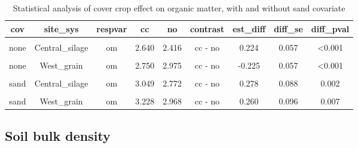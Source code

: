\documentclass[
]{article}
\begin{document}
\begin{table}[H]

\caption{\label{tab:omstats}Statistical analysis of cover crop effect on organic matter, with and without sand covariate}
\centering
\begin{tabular}[t]{ccccccccc}
\toprule
cov & site\_sys & respvar & cc & no & contrast & est\_diff & diff\_se & diff\_pval\\
\midrule
\cellcolor{gray!6}{none} & \cellcolor{gray!6}{Central\_grain} & \cellcolor{gray!6}{om} & \cellcolor{gray!6}{2.360} & \cellcolor{gray!6}{2.480} & \cellcolor{gray!6}{cc - no} & \cellcolor{gray!6}{-0.120} & \cellcolor{gray!6}{0.051} & \cellcolor{gray!6}{0.02}\\
\cmidrule{1-9}
none & Central\_silage & om & 2.640 & 2.416 & cc - no & 0.224 & 0.057 & <0.001\\
\cmidrule{1-9}
\cellcolor{gray!6}{none} & \cellcolor{gray!6}{East\_grain} & \cellcolor{gray!6}{om} & \cellcolor{gray!6}{3.575} & \cellcolor{gray!6}{3.675} & \cellcolor{gray!6}{cc - no} & \cellcolor{gray!6}{-0.100} & \cellcolor{gray!6}{0.057} & \cellcolor{gray!6}{0.082}\\
\cmidrule{1-9}
none & West\_grain & om & 2.750 & 2.975 & cc - no & -0.225 & 0.057 & <0.001\\
\cmidrule{1-9}
\cellcolor{gray!6}{sand} & \cellcolor{gray!6}{Central\_grain} & \cellcolor{gray!6}{om} & \cellcolor{gray!6}{3.034} & \cellcolor{gray!6}{3.066} & \cellcolor{gray!6}{cc - no} & \cellcolor{gray!6}{-0.032} & \cellcolor{gray!6}{0.082} & \cellcolor{gray!6}{0.696}\\
\cmidrule{1-9}
sand & Central\_silage & om & 3.049 & 2.772 & cc - no & 0.278 & 0.088 & 0.002\\
\cmidrule{1-9}
\cellcolor{gray!6}{sand} & \cellcolor{gray!6}{East\_grain} & \cellcolor{gray!6}{om} & \cellcolor{gray!6}{2.290} & \cellcolor{gray!6}{2.105} & \cellcolor{gray!6}{cc - no} & \cellcolor{gray!6}{0.185} & \cellcolor{gray!6}{0.093} & \cellcolor{gray!6}{0.048}\\
\cmidrule{1-9}
sand & West\_grain & om & 3.228 & 2.968 & cc - no & 0.260 & 0.096 & 0.007\\
\bottomrule
\end{tabular}
\end{table}

\hypertarget{soil-bulk-density}{%
\subsection{Soil bulk density}\label{soil-bulk-density}}
\end{document}
